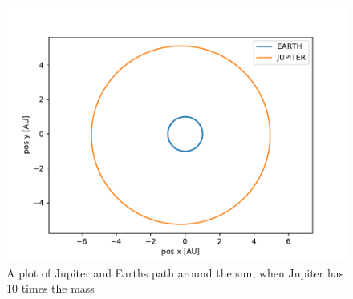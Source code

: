 \documentclass[a4paper]{article}
\begin{document}
\begin{figure}[h!]
	\centering 
	\includegraphics[scale=0.7]{../opp_e10.pdf}
	\caption{A plot of Jupiter and Earths path around the sun, when Jupiter has 10 times the mass}
	\label{e_10}
\end{figure}
\end{document}
